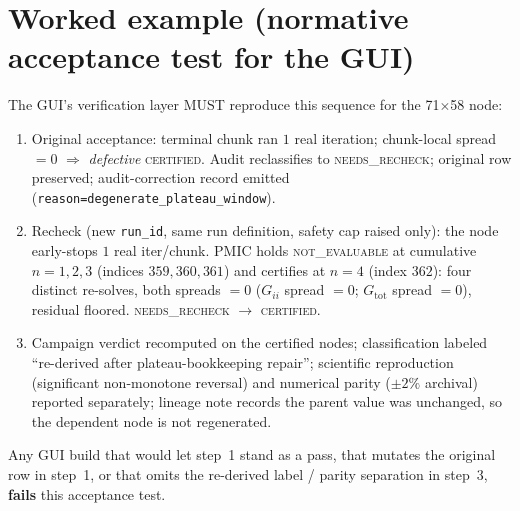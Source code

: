 \documentclass[11pt]{article}
\newcommand{\state}[1]{\textsc{#1}}
\newcommand{\code}[1]{\texttt{#1}}
\begin{document}
\section{Worked example (normative acceptance test for the GUI)}
The GUI's verification layer MUST reproduce this sequence for the 71$\times$58 node:
\begin{enumerate}[leftmargin=1.6em,itemsep=1pt]
\item Original acceptance: terminal chunk ran $1$ real iteration; chunk-local spread $=0$ $\Rightarrow$
\emph{defective} \state{certified}. Audit reclassifies to \state{needs\_recheck}; original row preserved;
audit-correction record emitted (\code{reason=degenerate\_plateau\_window}).
\item Recheck (new \code{run\_id}, same run definition, safety cap raised only): the node early-stops
$1$ real iter/chunk. PMIC holds \state{not\_evaluable} at cumulative $n{=}1,2,3$ (indices $359,360,361$)
and certifies at $n{=}4$ (index $362$): four distinct re-solves, both spreads $=0$ ($G_{ii}$ spread $=0$;
$G_{\mathrm{tot}}$ spread $=0$), residual floored.
\state{needs\_recheck} $\rightarrow$ \state{certified}.
\item Campaign verdict recomputed on the certified nodes; classification labeled ``re-derived after
plateau-bookkeeping repair''; scientific reproduction (significant non-monotone reversal) and numerical
parity ($\pm2\%$ archival) reported separately; lineage note records the parent value was unchanged, so
the dependent node is not regenerated.
\end{enumerate}
Any GUI build that would let step~1 stand as a pass, that mutates the original row in step~1, or that
omits the re-derived label / parity separation in step~3, \textbf{fails} this acceptance test.
\end{document}

